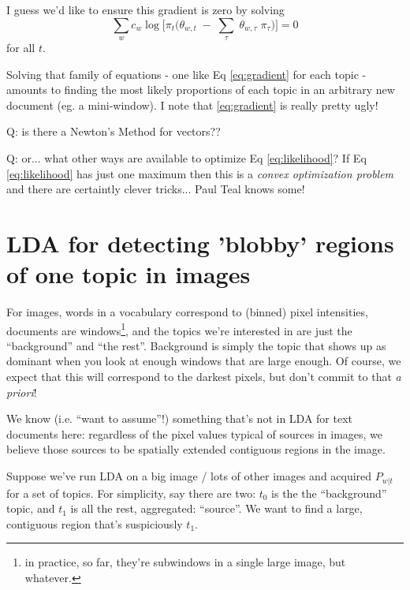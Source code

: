 \documentclass[11pt]{article}
\begin{document}
I guess we'd like to ensure this gradient is zero by solving
\begin{equation}
 \sum_w c_w \log \bigg[ \pi_t \bigg( \theta_{w,t}  \; - \;  \sum_\tau  \; \theta_{w,\tau} \; \pi_\tau  \bigg) \bigg] = 0 \label{eq:gradient} 
\end{equation}
for all $t$.

Solving that family of equations - one like Eq \ref{eq:gradient} for
each topic - amounts to finding the most likely proportions of each
topic in an arbitrary new document (eg. a mini-window). I note that
\ref{eq:gradient} is really pretty ugly!

Q: is there a Newton's Method for vectors??


\Line


Q: or... what other ways are available to optimize Eq
\ref{eq:likelihood}?  If Eq \ref{eq:likelihood} has just one maximum
then this is a {\it convex optimization problem} and there are
certaintly clever tricks... Paul Teal knows some!


\section{LDA for detecting 'blobby' regions of one topic in images \label{sec:images}}

For images, words in a vocabulary correspond to (binned) pixel
intensities, documents are windows\footnote{in practice, so far,
  they're subwindows in a single large image, but whatever.}, and the
topics we're interested in are just the ``background'' and ``the
rest''. Background is simply the topic that shows up as dominant when
you look at enough windows that are large enough. Of course, we expect
that this will correspond to the darkest pixels, but don't commit to
that {\it a priori}!

We know (i.e. ``want to assume''!) something that's not in LDA for
text documents here: regardless of the pixel values typical of sources
in images, we believe those sources to be spatially extended
contiguous regions in the image.

Suppose we've run LDA on a big image / lots of other images and
acquired $P_{w|t}$ for a set of topics. For simplicity, say there are
two: $t_0$ is the the ``background'' topic, and $t_1$ is all the rest,
aggregated: ``source''.
We want to find a large, contiguous region that's suspiciously $t_1$.
\end{document}
